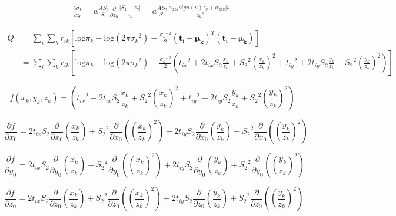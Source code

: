 \documentclass{article}
\begin{document}
\begin{align}
\frac{\partial \sigma_k}{\partial z_0} =  a\frac{AS_2}{S_1} \frac{\partial}{\partial z_0} \frac{|S_1-z_k|}{z_k} =   a\frac{AS_2}{S_1} \frac{\alpha_{zzk}sign(u)z_k + \alpha_{zzk}|u|}{{z_k}^2}
\end{align}


\begin{align} \label{eqn:Q_no_weight}
Q &= \sum_i \sum_k r_{ik} \left[ \text{log}\pi_k - \text{log}(2\pi{\sigma_k}^2) - \frac{{\sigma_k}^{-2}}{2}(\bm{t_i}-\bm{\mu_k})^T(\bm{t_i}-\bm{\mu_k}) \right] \\
&= \sum_i \sum_k r_{ik} \left[ \text{log}\pi_k - \text{log}(2\pi{\sigma_k}^2) - \frac{{\sigma_k}^{-2}}{2} \left({t_{ix}}^2 + 2t_{ix}S_2\frac{x_k}{z_k} + {S_2}^2\left(\frac{x_k}{z_k}\right)^2 + {t_{iy}}^2 + 2t_{iy}S_2\frac{y_k}{z_k} + {S_2}^2\left(\frac{y_k}{z_k}\right)^2 \right) \right]
\end{align}

\begin{equation}
f(x_k,y_k,z_k) = \left({t_{ix}}^2 + 2t_{ix}S_2\frac{x_k}{z_k} + {S_2}^2\left(\frac{x_k}{z_k}\right)^2 + {t_{iy}}^2 + 2t_{iy}S_2\frac{y_k}{z_k} + {S_2}^2\left(\frac{y_k}{z_k}\right)^2 \right)
\end{equation}

\begin{equation}
\frac{\partial f}{\partial x_0} = 2t_{ix}S_2 \frac{\partial}{\partial x_0} \left(\frac{x_k}{z_k}\right) + {S_2}^2 \frac{\partial}{\partial x_0}\left(\left(\frac{x_k}{z_k}\right)^2\right) + 2t_{iy}S_2 \frac{\partial}{\partial x_0} \left(\frac{y_k}{z_k}\right) + {S_2}^2 \frac{\partial}{\partial x_0}\left(\left(\frac{y_k}{z_k}\right)^2\right)
\end{equation}

\begin{equation}
\frac{\partial f}{\partial y_0} = 2t_{ix}S_2 \frac{\partial}{\partial y_0} \left(\frac{x_k}{z_k}\right) + {S_2}^2 \frac{\partial}{\partial y_0}\left(\left(\frac{x_k}{z_k}\right)^2\right) + 2t_{iy}S_2 \frac{\partial}{\partial y_0} \left(\frac{y_k}{z_k}\right) + {S_2}^2 \frac{\partial}{\partial y_0}\left(\left(\frac{y_k}{z_k}\right)^2\right)
\end{equation}

\begin{equation}
\frac{\partial f}{\partial z_0} = 2t_{ix}S_2 \frac{\partial}{\partial z_0} \left(\frac{x_k}{z_k}\right) + {S_2}^2 \frac{\partial}{\partial z_0}\left(\left(\frac{x_k}{z_k}\right)^2\right) + 2t_{iy}S_2 \frac{\partial}{\partial z_0} \left(\frac{y_k}{z_k}\right) + {S_2}^2 \frac{\partial}{\partial z_0}\left(\left(\frac{y_k}{z_k}\right)^2\right)
\end{equation}
\end{document}
